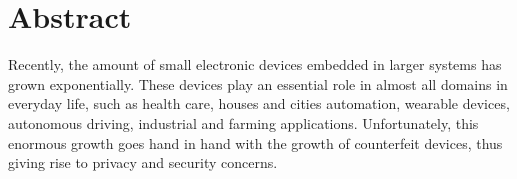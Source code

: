 \chapter*{Abstract}

Recently, the amount of small electronic devices embedded in larger systems has grown exponentially. These devices play an essential role in almost all domains in everyday life, such as health care, houses and cities  automation, wearable devices, autonomous driving, industrial and farming applications. Unfortunately, this enormous growth goes hand in hand with the growth of counterfeit devices, thus giving rise to privacy and security concerns. 

